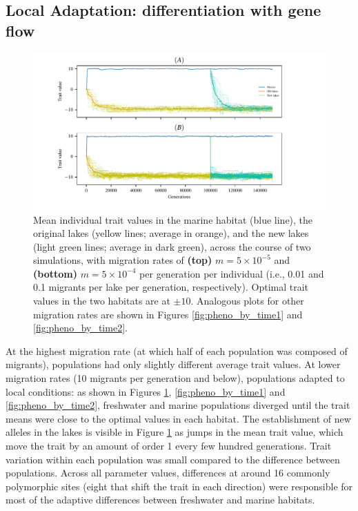 \documentclass{article}
\begin{document}
\subsection*{Local Adaptation: differentiation with gene flow}

\begin{figure}
	\begin{center}
        \includegraphics{Final_Plots/Pheno_Time.pdf}
  		\caption{ 
        		Mean individual trait values in the marine habitat (blue line),
        		the original lakes (yellow lines; average in orange),
        		and the new lakes (light green lines; average in dark green),
        		across the course of two simulations, with migration rates of
        		\textbf{(top)} $m=5 \times 10^{-5}$ and
        		\textbf{(bottom)} $m=5 \times 10^{-4}$ per generation per individual
        		(i.e., 0.01 and 0.1 migrants per lake per generation, respectively).
        		Optimal trait values in the two habitats are at $\pm 10$.
                Analogous plots for other migration rates
                are shown in Figures \ref{fig:pheno_by_time1} and \ref{fig:pheno_by_time2}.
		}
  		\label{fig:phenotype_ts2}
	\end{center}
\end{figure}

At the highest migration rate (at which half of each population was composed of migrants),
populations had only slightly different average trait values.
At lower migration rates (10 migrants per generation and below),
populations adapted to local conditions:
as shown in Figures \ref{fig:phenotype_ts2},
\ref{fig:pheno_by_time1} and \ref{fig:pheno_by_time2},
freshwater and marine populations diverged
until the trait means were close to the optimal values in each habitat. 
The establishment of new alleles in the lakes is visible in Figure \ref{fig:phenotype_ts2}
as jumps in the mean trait value,
which move the trait by an amount of order 1 every few hundred generations.
Trait variation within each population was small compared to the difference between populations.
Across all parameter values, differences at around 16 commonly polymorphic sites 
(eight that shift the trait in each direction)
were responsible for most of the adaptive differences between freshwater and marine habitats.
\end{document}

